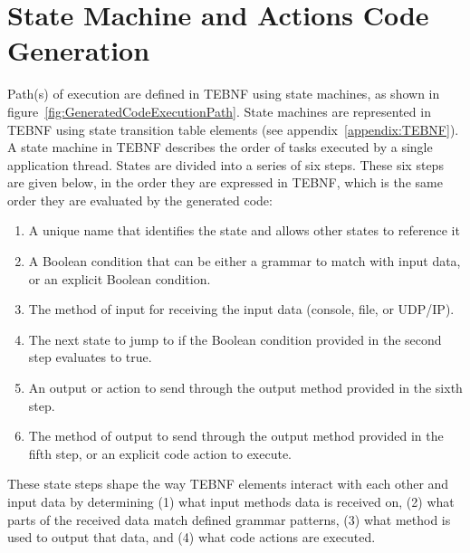 \section{State Machine and Actions Code Generation}
Path(s) of execution are defined in TEBNF using state machines, as shown in figure~\ref{fig:GeneratedCodeExecutionPath}.  State machines are represented in TEBNF using state transition table elements (see appendix~\ref{appendix:TEBNF}).  A state machine in TEBNF describes the order of tasks executed by a single application thread.  States are divided into a series of six steps.  These six steps are given below, in the order they are expressed in TEBNF, which is the same order they are evaluated by the generated code:
\begin{enumerate}
  \item A unique name that identifies the state and allows other states to reference it
  \item A Boolean condition that can be either a grammar to match with input data, or an explicit Boolean condition.
  \item The method of input for receiving the input data (console, file, or UDP/IP).
  \item The next state to jump to if the Boolean condition provided in the second step evaluates to true.
  \item An output or action to send through the output method provided in the sixth step.
  \item The method of output to send through the output method provided in the fifth step, or an explicit code action to execute.
\end{enumerate}

\indent
These state steps shape the way TEBNF elements interact with each other and input data by determining (1) what input methods data is received on, (2) what parts of the received data match defined grammar patterns, (3) what method is used to output that data, and (4) what code actions are executed.

